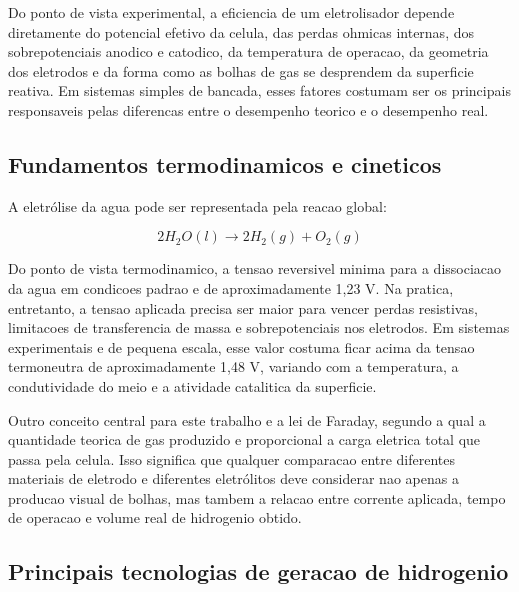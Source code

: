 \documentclass[12pt,oneside,a4paper,english,brazilian]{abntex2}
\begin{document}
Do ponto de vista experimental, a eficiencia de um eletrolisador depende diretamente do potencial efetivo da celula, das perdas ohmicas internas, dos sobrepotenciais anodico e catodico, da temperatura de operacao, da geometria dos eletrodos e da forma como as bolhas de gas se desprendem da superficie reativa. Em sistemas simples de bancada, esses fatores costumam ser os principais responsaveis pelas diferencas entre o desempenho teorico e o desempenho real.

\subsection{Fundamentos termodinamicos e cineticos}

A eletrólise da agua pode ser representada pela reacao global:

\[
2H_2O(l) \rightarrow 2H_2(g) + O_2(g)
\]

Do ponto de vista termodinamico, a tensao reversivel minima para a dissociacao da agua em condicoes padrao e de aproximadamente 1,23 V. Na pratica, entretanto, a tensao aplicada precisa ser maior para vencer perdas resistivas, limitacoes de transferencia de massa e sobrepotenciais nos eletrodos. Em sistemas experimentais e de pequena escala, esse valor costuma ficar acima da tensao termoneutra de aproximadamente 1,48 V, variando com a temperatura, a condutividade do meio e a atividade catalitica da superficie.

Outro conceito central para este trabalho e a lei de Faraday, segundo a qual a quantidade teorica de gas produzido e proporcional a carga eletrica total que passa pela celula. Isso significa que qualquer comparacao entre diferentes materiais de eletrodo e diferentes eletrólitos deve considerar nao apenas a producao visual de bolhas, mas tambem a relacao entre corrente aplicada, tempo de operacao e volume real de hidrogenio obtido.

\subsection{Principais tecnologias de geracao de hidrogenio}
\end{document}
